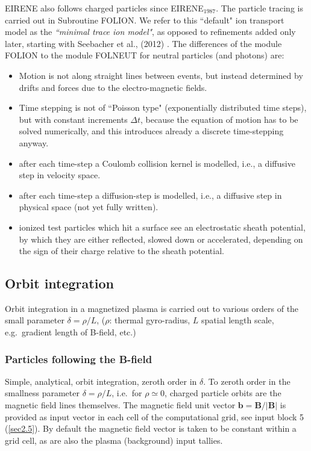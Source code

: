 EIRENE also follows charged particles since EIRENE$_{1987}$.
The particle tracing is carried out in Subroutine FOLION.
We refer to this ``default" ion transport model as the \emph{``minimal trace
  ion model"}, as opposed to refinements added only later, starting with
Seebacher et al., (2012) \cite{kn:Seebacher}.
The differences of the module FOLION to the module FOLNEUT for neutral
particles (and photons) are:
\begin{itemize}
  \item Motion is not along straight lines between events, but instead determined
        by drifts and forces due to the electro-magnetic fields.
  \item Time stepping is not of ``Poisson type" (exponentially distributed time
        steps), but with constant increments $\Delta t$, because the equation of motion
        has to be solved numerically, and this introduces already a discrete
        time-stepping anyway.
  \item after each time-step a Coulomb collision kernel is modelled, i.e., a
        diffusive step in velocity space.
  \item after each time-step a diffusion-step is modelled, i.e., a diffusive step
        in physical space (not yet fully written).
  \item ionized test particles which hit a surface see an electrostatic sheath
        potential, by which they are either reflected, slowed down or accelerated,
        depending on the sign of their charge relative to the sheath potential.
\end{itemize}

\subsection{Orbit integration}

Orbit integration in a magnetized plasma is carried out to various orders of
the small parameter $\delta = \rho/L$, ($\rho$:
thermal gyro-radius, $L$ spatial length scale, e.g.\ gradient length of
B-field, etc.)

\subsubsection{Particles following the B-field}

Simple, analytical, orbit integration, zeroth order in $\delta$.
To zeroth order in the smallness parameter $\delta=\rho/L$, i.e.\ for $\rho
  \simeq 0$, charged particle orbits are the magnetic field lines themselves.
The magnetic field unit vector $\textbf{b}=\textbf{B}/|\textbf{B}|$ is provided
as input vector in each cell of the computational grid, see input block 5
(\cref{sec2.5}).
By default the magnetic field vector is taken to be constant within a grid
cell, as are also the plasma (background) input tallies.

